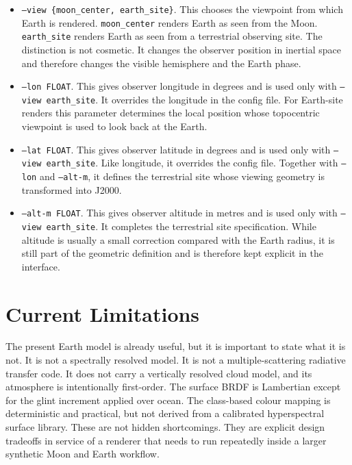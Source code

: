 \documentclass[12pt,a4paper]{article}
\begin{document}
\begin{itemize}
  \item \texttt{--view \{moon\_center, earth\_site\}}. This chooses the viewpoint from which Earth is rendered. \texttt{moon\_center} renders Earth as seen from the Moon. \texttt{earth\_site} renders Earth as seen from a terrestrial observing site. The distinction is not cosmetic. It changes the observer position in inertial space and therefore changes the visible hemisphere and the Earth phase.
  \item \texttt{--lon FLOAT}. This gives observer longitude in degrees and is used only with \texttt{--view earth\_site}. It overrides the longitude in the config file. For Earth-site renders this parameter determines the local position whose topocentric viewpoint is used to look back at the Earth.
  \item \texttt{--lat FLOAT}. This gives observer latitude in degrees and is used only with \texttt{--view earth\_site}. Like longitude, it overrides the config file. Together with \texttt{--lon} and \texttt{--alt-m}, it defines the terrestrial site whose viewing geometry is transformed into J2000.
  \item \texttt{--alt-m FLOAT}. This gives observer altitude in metres and is used only with \texttt{--view earth\_site}. It completes the terrestrial site specification. While altitude is usually a small correction compared with the Earth radius, it is still part of the geometric definition and is therefore kept explicit in the interface.
\end{itemize}

\section{Current Limitations}
The present Earth model is already useful, but it is important to state what it is not. It is not a spectrally resolved model. It is not a multiple-scattering radiative transfer code. It does not carry a vertically resolved cloud model, and its atmosphere is intentionally first-order. The surface BRDF is Lambertian except for the glint increment applied over ocean. The class-based colour mapping is deterministic and practical, but not derived from a calibrated hyperspectral surface library. These are not hidden shortcomings. They are explicit design tradeoffs in service of a renderer that needs to run repeatedly inside a larger synthetic Moon and Earth workflow.
\end{document}

